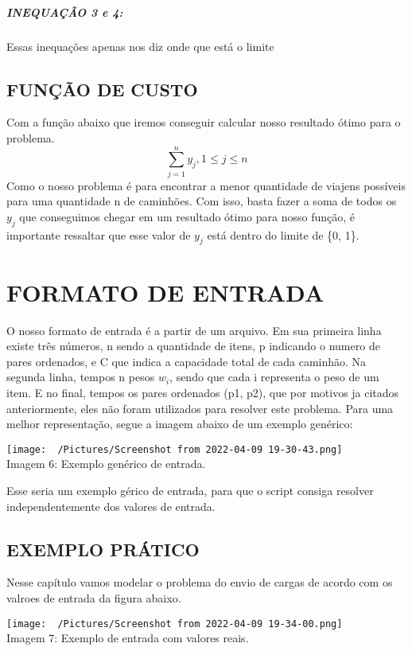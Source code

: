\paragraph{INEQUAÇÃO 3 e 4:}
  Essas inequações apenas nos diz onde que está o limite 

\section{FUNÇÃO DE CUSTO}
  Com a função abaixo que iremos conseguir calcular nosso resultado ótimo para o problema. 
  \[\sum_{j=1}^{n}y_{j}, 1 \leq j \leq n\]
  Como o nosso problema é para encontrar a menor quantidade de viajens possíveis para uma quantidade n de caminhões. Com isso, basta fazer a soma de todos os \(y_{j}\) que conseguimos chegar em um resultado ótimo para nosso função, é importante ressaltar que esse valor de \( y_{j}\) está dentro do limite de \{0, 1\}.

\chapter{FORMATO DE ENTRADA}
  O nosso formato de entrada é a partir de um arquivo. Em sua primeira linha existe três números, n sendo a quantidade de itens, p indicando o numero de pares ordenados, e C que indica a capacidade total de cada caminhão. Na segunda linha, tempos n pesos \(w_{i}\), sendo que cada i representa o peso de um item. E no final, tempos os pares ordenados (p1, p2), que por motivos ja citados anteriormente, eles não foram utilizados para resolver este problema. Para uma melhor representação, segue a imagem abaixo de um exemplo genérico:
\begin{center}
  \texttt{[image: ~/Pictures/Screenshot from 2022-04-09 19-30-43.png]}\\
  Imagem 6: Exemplo genérico de entrada.
\end{center}
  Esse seria um exemplo gérico de entrada, para que o script consiga resolver independentemente dos valores de entrada.  
  
  \section{EXEMPLO PRÁTICO}
    Nesse capítulo vamos modelar o problema do envio de cargas de acordo com os valroes de entrada da figura abaixo.
    \begin{center}
      \texttt{[image: ~/Pictures/Screenshot from 2022-04-09 19-34-00.png]}\\
      Imagem 7: Exemplo de entrada com valores reais.
    \end{center}

